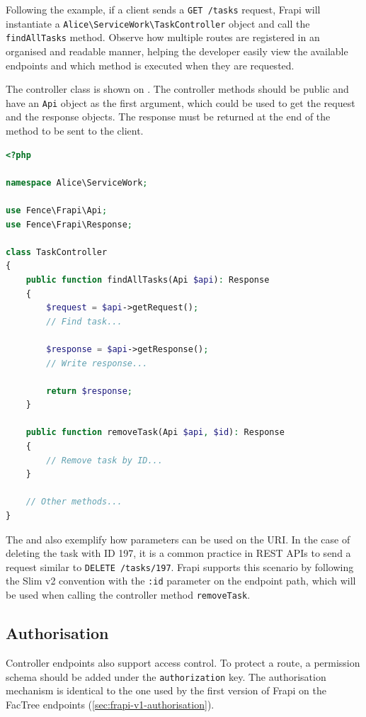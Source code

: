 Following the example, if a client sends a \texttt{GET /tasks} request, Frapi will instantiate a \texttt{Alice\textbackslash ServiceWork\textbackslash TaskController} object and call the \texttt{findAllTasks} method. Observe how multiple routes are registered in an organised and readable manner, helping the developer easily view the available endpoints and which method is executed when they are requested.

The controller class is shown on . The controller methods should be public and have an \texttt{Api} object as the first argument, which could be used to get the request and the response objects. The response must be returned at the end of the method to be sent to the client.

\begin{lstlisting}[language=PHP,label={code:controller-endpoint-php},caption={Controller class that handles Service Work task-related requests.}]
<?php

namespace Alice\ServiceWork;

use Fence\Frapi\Api;
use Fence\Frapi\Response;

class TaskController
{
	public function findAllTasks(Api $api): Response
	{
		$request = $api->getRequest();
		// Find task...
		
		$response = $api->getResponse();
		// Write response...

		return $response;
	}

	public function removeTask(Api $api, $id): Response
	{
		// Remove task by ID...
	}

	// Other methods...
}
\end{lstlisting}

The  and  also exemplify how parameters can be used on the URI. In the case of deleting the task with ID 197, it is a common practice in REST APIs to send a request similar to \texttt{DELETE /tasks/197}. Frapi supports this scenario by following the Slim v2 convention \cite{slim-v2-routing-params} with the \texttt{:id} parameter on the endpoint path, which will be used when calling the controller method \texttt{removeTask}.

\subsection{Authorisation}

Controller endpoints also support access control. To protect a route, a permission schema should be added under the \texttt{authorization} key. The authorisation mechanism is identical to the one used by the first version of Frapi on the FacTree endpoints (\autoref{sec:frapi-v1-authorisation}).

